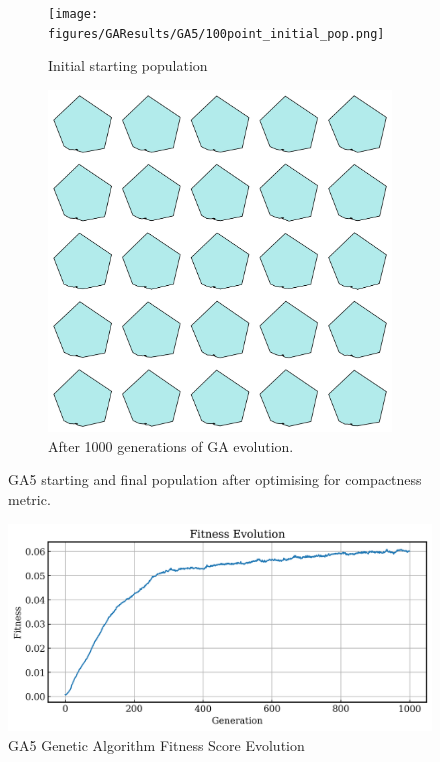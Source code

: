 \documentclass{article}
\begin{document}
\begin{figure}[H]
    \centering
    \begin{subfigure}[b]{0.45\textwidth}
        \centering
        \texttt{[image: figures/GAResults/GA5/100point\_initial\_pop.png]}
        \caption{Initial starting population}
        \label{fig:GA5_starting}
    \end{subfigure}
    \hfill
    \begin{subfigure}[b]{0.45\textwidth}
        \centering
        \includegraphics[width=\textwidth]{figures/GAResults/GA5/final_population.png}
        \caption{After 1000 generations of GA evolution.}
        \label{fig:GA5_final}
    \end{subfigure}
    \caption{GA5 starting and final population after optimising for compactness metric.}
    \label{fig:GA5_before_after_GA}
\end{figure}

\begin{figure}[H]
    \centering
    \includegraphics[width=0.75\linewidth]{figures/GAResults/GA5/1000gens_10pars_100initpop_5pcent_mut.png}
    \caption{GA5 Genetic Algorithm Fitness Score Evolution}
    \label{fig:GA5_fitness}
\end{figure}
\end{document}
